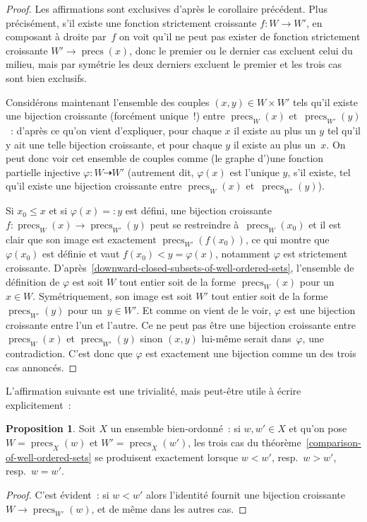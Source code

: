 \documentclass[12pt,a4paper]{article}
\theoremstyle{definition}
\newtheorem{prop}[comcnt]{Proposition}
\newcommand{\precs}{\operatorname{precs}}
\begin{document}
\begin{proof}
Les affirmations sont exclusives d'après le corollaire précédent.
Plus précisément, s'il existe une fonction strictement croissante
$f\colon W \to W'$, en composant à droite par $f$ on voit qu'il ne
peut pas exister de fonction strictement croissante $W' \to
\precs(x)$, donc le premier ou le dernier cas excluent celui du
milieu, mais par symétrie les deux derniers excluent le premier et les
trois cas sont bien exclusifs.

Considérons maintenant l'ensemble des couples $(x,y) \in W\times W'$
tels qu'il existe une bijection croissante (forcément unique !) entre
$\precs_W(x)$ et $\precs_{W'}(y)$ : d'après ce qu'on vient
d'expliquer, pour chaque $x$ il existe au plus un $y$ tel qu'il y ait
une telle bijection croissante, et pour chaque $y$ il existe au plus
un $x$.  On peut donc voir cet ensemble de couples comme (le graphe
d')une fonction partielle injective $\varphi\colon W \dasharrow W'$
(autrement dit, $\varphi(x)$ est l'unique $y$, s'il existe, tel qu'il
existe une bijection croissante entre $\precs_W(x)$
et $\precs_{W'}(y)$).

Si $x_0 \leq x$ et si $\varphi(x) =: y$ est défini, une bijection
croissante $f\colon \precs_W(x) \to \precs_{W'}(y)$ peut se
restreindre à $\precs_W(x_0)$ et il est clair que son image est
exactement $\precs_{W'}(f(x_0))$, ce qui montre que $\varphi(x_0)$ est
définie et vaut $f(x_0) < y = \varphi(x)$, notamment $\varphi$ est
strictement croissante.
D'après \ref{downward-closed-subsets-of-well-ordered-sets}, l'ensemble
de définition de $\varphi$ est soit $W$ tout entier soit de la forme
$\precs_W(x)$ pour un $x\in W$.  Symétriquement, son image est soit
$W'$ tout entier soit de la forme $\precs_{W'}(y)$ pour un $y\in W'$.
Et comme on vient de le voir, $\varphi$ est une bijection croissante
entre l'un et l'autre.  Ce ne peut pas être une bijection croissante
entre $\precs_W(x)$ et $\precs_{W'}(y)$ sinon $(x,y)$ lui-même serait
dans $\varphi$, une contradiction.  C'est donc que $\varphi$ est
exactement une bijection comme un des trois cas annoncés.
\end{proof}

L'affirmation suivante est une trivialité, mais peut-être utile à
écrire explicitement :
\begin{prop}\label{triviality-on-comparison-of-initial-segments-in-well-ordered-sets}
Soit $X$ un ensemble bien-ordonné : si $w,w' \in X$ et qu'on pose $W =
\precs_X(w)$ et $W' = \precs_X(w')$, les trois cas du
théorème \ref{comparison-of-well-ordered-sets} se produisent
exactement lorsque $w < w'$, resp. $w > w'$, resp. $w = w'$.
\end{prop}
\begin{proof}
C'est évident : si $w < w'$ alors l'identité fournit une bijection
croissante $W \to \precs_{W'}(w)$, et de même dans les autres cas.
\end{proof}
\end{document}
